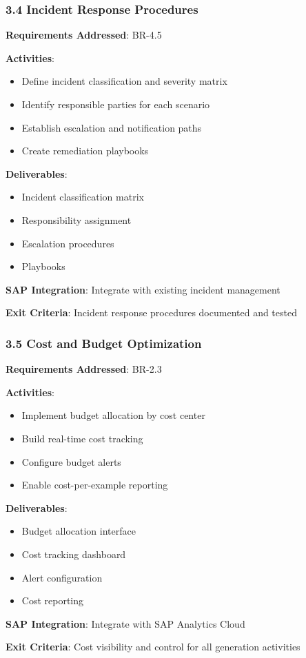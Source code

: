 \documentclass[12pt,a4paper,twoside]{report}
\begin{document}
\subsubsection{3.4 Incident Response Procedures}

\begin{tcolorbox}[colback=orange!5,colframe=orange!70,title=3.4 Incident Management]
\textbf{Requirements Addressed}: BR-4.5

\textbf{Activities}:
\begin{itemize}
\item Define incident classification and severity matrix
\item Identify responsible parties for each scenario
\item Establish escalation and notification paths
\item Create remediation playbooks
\end{itemize}

\textbf{Deliverables}:
\begin{itemize}
\item Incident classification matrix
\item Responsibility assignment
\item Escalation procedures
\item Playbooks
\end{itemize}

\textbf{SAP Integration}: Integrate with existing incident management

\textbf{Exit Criteria}: Incident response procedures documented and tested
\end{tcolorbox}

\subsubsection{3.5 Cost and Budget Optimization}

\begin{tcolorbox}[colback=orange!5,colframe=orange!70,title=3.5 Cost Management]
\textbf{Requirements Addressed}: BR-2.3

\textbf{Activities}:
\begin{itemize}
\item Implement budget allocation by cost center
\item Build real-time cost tracking
\item Configure budget alerts
\item Enable cost-per-example reporting
\end{itemize}

\textbf{Deliverables}:
\begin{itemize}
\item Budget allocation interface
\item Cost tracking dashboard
\item Alert configuration
\item Cost reporting
\end{itemize}

\textbf{SAP Integration}: Integrate with SAP Analytics Cloud

\textbf{Exit Criteria}: Cost visibility and control for all generation activities
\end{tcolorbox}
\end{document}
